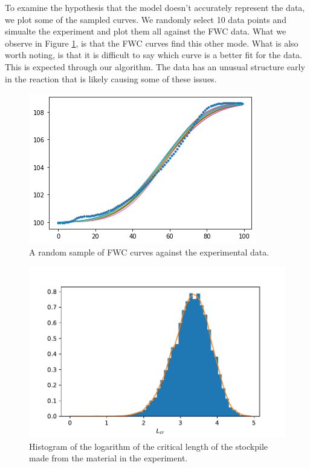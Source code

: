 To examine the hypothesis that the model doesn't accurately represent the data, we plot some of the sampled curves. We randomly select 10 data points and simualte the experiment and plot them all against the FWC data. What we observe in Figure \ref{fig:comp_exp}, is that the FWC curves find this other mode. What is also worth noting, is that it is difficult to say which curve is a better fit for the data. This is expected through our algorithm. The data has an unusual structure early in the reaction that is likely causing some of these issues.\\

\begin{figure}[h!]
\centering
\includegraphics[width=\linewidth]{figures/bayesian/1_reaction/EXP/example_curve.png}
\caption{A random sample of FWC curves against the experimental data.}
\label{fig:comp_exp}
\end{figure}

\begin{figure}[h!]
\centering
\includegraphics[width=\linewidth]{figures/bayesian/1_reaction/EXP/hist_Lcr.pdf}
\caption{Histogram of the logarithm of the critical length of the stockpile made from the material in the experiment.}
\label{fig:Lcr_exp}
\end{figure}

